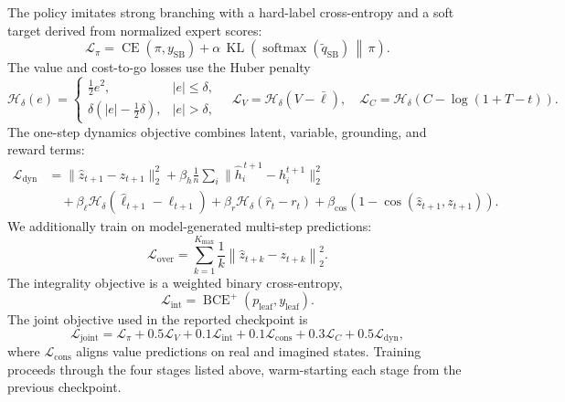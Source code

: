 \documentclass{article}
\newcommand{\softmax}{\operatorname{softmax}}
\begin{document}
The policy imitates strong branching with a hard-label cross-entropy and a soft target derived from normalized expert scores:
\begin{equation}
  \mathcal{L}_{\pi}
  =
  \operatorname{CE}(\pi,y_{\mathrm{SB}})
  +\alpha\,
    \operatorname{KL}\!\left(
      \softmax(\widetilde q_{\mathrm{SB}})
      \,\middle\|\,\pi
    \right).
  \label{eq:policy-loss}
\end{equation}
The value and cost-to-go losses use the Huber penalty
\begin{equation}
  \mathcal{H}_\delta(e)=
  \begin{cases}
    \frac12 e^2,& |e|\le\delta,\\
    \delta\left(|e|-\frac12\delta\right),& |e|>\delta,
  \end{cases}
  \quad
  \mathcal{L}_V=\mathcal{H}_\delta(V-\bar\ell),
  \quad
  \mathcal{L}_C=\mathcal{H}_\delta(C-\log(1+T-t)).
  \label{eq:huber}
\end{equation}
The one-step dynamics objective combines latent, variable, grounding, and reward terms:
\begin{align}
  \mathcal{L}_{\mathrm{dyn}}
  &=
  \|\widehat z_{t+1}-z_{t+1}\|_2^2
  +\beta_h\frac1n\sum_i
    \|\widehat h_i^{\,t+1}-h_i^{t+1}\|_2^2 \nonumber\\
  &\quad
  +\beta_\ell\mathcal{H}_\delta(\widehat\ell_{t+1}-\ell_{t+1})
  +\beta_r\mathcal{H}_\delta(\widehat r_t-r_t)
  +\beta_{\cos}
    \left(1-\cos(\widehat z_{t+1},z_{t+1})\right).
  \label{eq:dynamics-loss}
\end{align}
We additionally train on model-generated multi-step predictions:
\begin{equation}
  \mathcal{L}_{\mathrm{over}}=
  \sum_{k=1}^{K_{\max}}\frac1k
  \left\|\widehat z_{t+k}-z_{t+k}\right\|_2^2 .
  \label{eq:overshoot}
\end{equation}
The integrality objective is a weighted binary cross-entropy,
\begin{equation}
  \mathcal{L}_{\mathrm{int}}=\operatorname{BCE}^{+}(p_{\mathrm{leaf}},y_{\mathrm{leaf}}).
  \label{eq:bce}
\end{equation}
The joint objective used in the reported checkpoint is
\begin{equation}
  \mathcal{L}_{\mathrm{joint}}
  =
  \mathcal{L}_{\pi}
  +0.5\mathcal{L}_{V}
  +0.1\mathcal{L}_{\mathrm{int}}
  +0.1\mathcal{L}_{\mathrm{cons}}
  +0.3\mathcal{L}_{C}
  +0.5\mathcal{L}_{\mathrm{dyn}},
  \label{eq:joint-loss}
\end{equation}
where $\mathcal{L}_{\mathrm{cons}}$ aligns value predictions on real and imagined states. Training proceeds through the four stages listed above, warm-starting each stage from the previous checkpoint.
\end{document}
